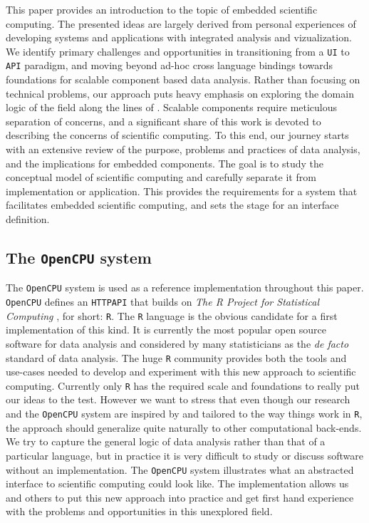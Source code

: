 \documentclass{article}
\newcommand{\R}{\texttt{R}\xspace}
\newcommand{\HTTP}{\texttt{HTTP}\xspace}
\newcommand{\UI}{\texttt{UI}\xspace}
\newcommand{\API}{\texttt{API}\xspace}
\newcommand{\OpenCPU}{\texttt{OpenCPU}\xspace}
\begin{document}
This paper provides an introduction to the topic of embedded scientific computing. The presented ideas are largely derived from personal experiences of developing systems and applications with integrated analysis and vizualization. We identify primary challenges and opportunities in transitioning from a \UI to \API paradigm, and moving beyond ad-hoc cross language bindings towards foundations for scalable component based data analysis. Rather than focusing on technical problems, our approach puts heavy emphasis on exploring the domain logic of the field along the lines of \citep{evans2004domain}. Scalable components require meticulous separation of concerns, and a significant share of this work is devoted to describing the concerns of scientific computing. To this end, our journey starts with an extensive review of the purpose, problems and practices of data analysis, and the implications for embedded components. The goal is to study the conceptual model of scientific computing and carefully separate it from implementation or application. This provides the requirements for a system that facilitates embedded scientific computing, and sets the stage for an interface definition.


\subsection{The \OpenCPU system}

The \OpenCPU system is used as a reference implementation throughout this paper. \OpenCPU defines an \HTTP \API that builds on \emph{The R Project for Statistical Computing} \citep{R}, for short: \R. The \R language is the obvious candidate for a first implementation of this kind. It is currently the most popular open source software for data analysis and considered by many statisticians as the \emph{de facto} standard of data analysis. The huge \R community provides both the tools and use-cases needed to develop and experiment with this new approach to scientific computing. Currently only \R has the required scale and foundations to really put our ideas to the test. However we want to stress that even though our research and the \OpenCPU system are inspired by and tailored to the way things work in \R, the approach should generalize quite naturally to other computational back-ends. We try to capture the general logic of data analysis rather than that of a particular language, but in practice it is very difficult to study or discuss software without an implementation. The \OpenCPU system illustrates what an abstracted interface to scientific computing could look like. The implementation allows us and others to put this new approach into practice and get first hand experience with the problems and opportunities in this unexplored field. 
\end{document}
